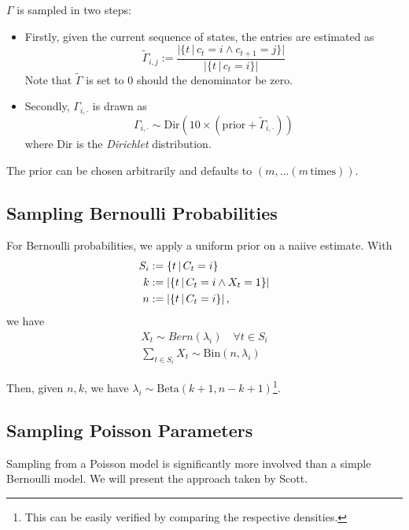  


 	$\Gamma$ is sampled in two steps:
 	\begin{itemize}
 		\item Firstly, given the current sequence of states, the entries are estimated as 
 			\[
 				\tilde{\Gamma}_{i, j} := \frac{ 
 					\Bigg| \Big\{ t \, | \, c_t = i \land c_{t+1} = j \Big\}\Bigg|	
 				 }{
 			 			\Bigg| \Big\{ t \, | \, c_t = i \Big\}\Bigg|	
 		 		}
 			\]
 			Note that $\tilde{\Gamma}$  is set to $0$ should the denominator be zero. 
 		\item Secondly, $\Gamma_{i, \cdot}$ is drawn as 
 			\[
 				\Gamma_{i, \cdot} \sim  \text{Dir}(10 \times (\text{prior} + \tilde{\Gamma}_{i, \cdot }))
 			\]
 			where Dir is the \textit{Dirichlet} distribution. 
 	\end{itemize}
 
 	The prior can be chosen arbitrarily and defaults to  $\left(m, \dots (m \, \text{times})\right)$.
 	
 	
 	\subsection{Sampling Bernoulli Probabilities}
 		For Bernoulli probabilities, we apply a uniform prior on a naiive estimate.
 		With
 		\begin{align*}
 			S_i &:= \left\{ t \, | \, C_t = i \right\}\\
 	        k &:= \left| \left\{ t \, | \, C_t = i \land X_t = 1 \right\} \right|\\
 			n &:= \left| \left\{ t \, | \, C_t = i \right\} \right|, \\			
 		\end{align*} 
 		we have
 		\begin{align*}
 			X_t \sim Bern(\lambda_i) \quad \forall t \in S_i\\
 			\sum_{t \in S_i} X_t \sim \text{Bin}(n, \lambda_i)
 		\end{align*}
 		
 		Then, given $n, k$, we have $\lambda_i \sim \text{Beta}(k+1, n-k+1)$\footnote{This can be easily verified by comparing the respective densities.}.
 		
 		
 	\subsection{Sampling Poisson Parameters}
		Sampling from a Poisson model is significantly more involved  than a simple Bernoulli model. We will present the approach taken by Scott\cite{scott}. 
		

